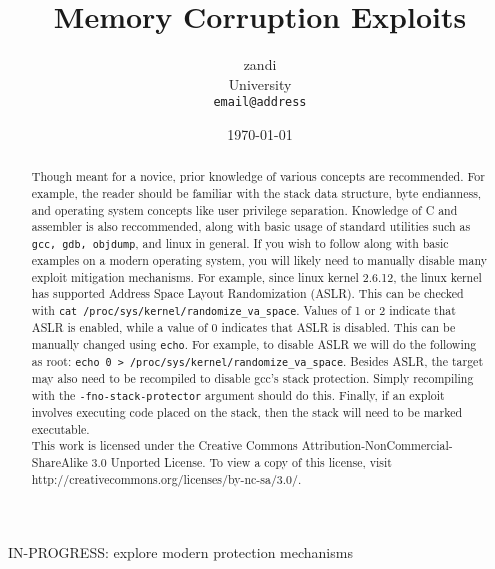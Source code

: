 \documentclass[a4paper]{article}
\begin{document}
\title{Memory Corruption Exploits}
\author{zandi\\
	University\\
	\texttt{email@address}}
\date{\today}
\maketitle

\begin{abstract}
Though meant for a novice, prior knowledge of various concepts are recommended. For example,
the reader should be familiar with the stack data structure, byte endianness, and operating system
concepts like user privilege separation. Knowledge of C and assembler is also reccommended, along
with basic usage of standard utilities such as \texttt{gcc, gdb, objdump}, and linux in general.
If you wish to follow along with basic examples on a modern operating system, you will likely
need to manually disable many exploit mitigation mechanisms. For example, since linux kernel
2.6.12, the linux kernel has supported Address Space Layout Randomization (ASLR). This can be
checked with \texttt{cat /proc/sys/kernel/randomize\_va\_space}. Values of 1 or 2 indicate that
ASLR is enabled, while a value of 0 indicates that ASLR is disabled. This can be manually
changed using \texttt{echo}. For example, to disable ASLR we will do the following as root:
\texttt{echo 0 > /proc/sys/kernel/randomize\_va\_space}. Besides ASLR, the target may also need to
be recompiled to disable gcc's stack protection. Simply recompiling with the \texttt{-fno-stack-protector}
argument should do this. Finally, if an exploit involves executing code placed on the stack, then
the stack will need to be marked executable.\\

This work is licensed under the Creative Commons Attribution-NonCommercial-ShareAlike 3.0 Unported License.
To view a copy of this license, visit http://creativecommons.org/licenses/by-nc-sa/3.0/.

\end{abstract}



IN-PROGRESS: explore modern protection mechanisms


\end{document}
